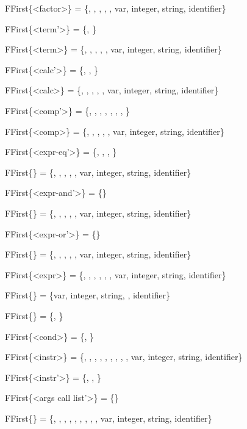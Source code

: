 ﻿FFirst\{<factor>\}          = \{\lit{(}, \lit{!}, \lit{+}, \lit{-}, \lit{\&}, var, integer, string, identifier\}

FFirst\{<term'>\}           = \{\lit{*}, \lit{/}\}

FFirst\{<term>\}            = \{\lit{(}, \lit{!}, \lit{+}, \lit{-}, \lit{\&}, var, integer, string, identifier\}

FFirst\{<calc'>\}           = \{\lit{+}, \lit{-}, \}

FFirst\{<calc>\}            = \{\lit{(}, \lit{!}, \lit{+}, \lit{-}, \lit{\&}, var, integer, string, identifier\}

FFirst\{<comp'>\}           = \{\lit{>}, \lit{\textless}, \lit{>=}, \lit{\textless=}, , , , \}

FFirst\{<comp>\}            = \{\lit{(}, \lit{!}, \lit{+}, \lit{-}, \lit{\&}, var, integer, string, identifier\}

FFirst\{<expr-eq'>\}        = \{\lit{==}, \lit{!=}, , \}

FFirst\{<expr-eq>\}         = \{\lit{(}, \lit{!}, \lit{+}, \lit{-}, \lit{\&}, var, integer, string, identifier\}

FFirst\{<expr-and'>\}       = \{\lit{\&\&}\}

FFirst\{<expr-and>\}        = \{\lit{(}, \lit{!}, \lit{+}, \lit{-}, \lit{\&}, var, integer, string, identifier\}

FFirst\{<expr-or'>\}        = \{\lit{||}\}

FFirst\{<expr-or>\}         = \{\lit{(}, \lit{!}, \lit{+}, \lit{-}, \lit{\&}, var, integer, string, identifier\}

FFirst\{<expr>\}            = \{, \lit{(}, \lit{!}, \lit{+}, \lit{-}, \lit{\&}, var, integer, string, identifier\}

FFirst\{<simple expr>\}     = \{var, integer, string, \lit{\&}, identifier\}

FFirst\{<cond end>\}        = \{, \}

FFirst\{<cond>\}            = \{, \}

FFirst\{<instr>\}           = \{, , , , \lit{(}, \lit{!}, \lit{+}, \lit{-}, \lit{\&}, var, integer, string, identifier\}

FFirst\{<instr'>\}          = \{\lit{=}, , \}

FFirst\{<args call list'>\} = \{\lit{,}\}

FFirst\{<args call list>\}  = \{, , , , \lit{(}, \lit{!}, \lit{+}, \lit{-}, \lit{\&}, var, integer, string, identifier\}

